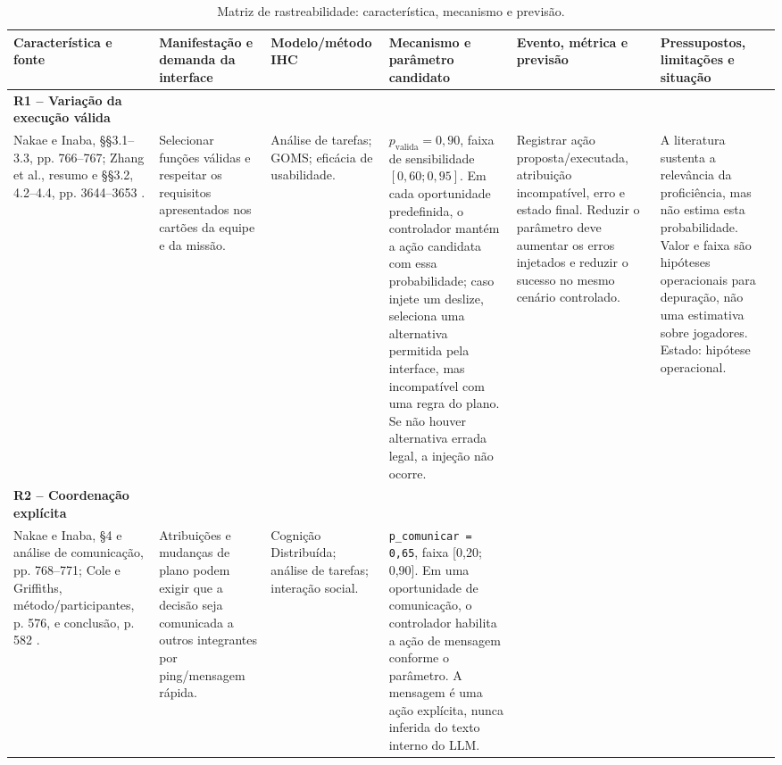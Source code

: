 \documentclass[conference]{IEEEtran}
\begin{document}
\begin{table}[!t]
\centering
\caption{Matriz de rastreabilidade: característica, mecanismo e previsão.}
\label{tab:matriz}
\scriptsize
\renewcommand{\arraystretch}{1.12}
\setlength{\tabcolsep}{3pt}
\begin{tabularx}{\textwidth}{@{}>{\RaggedRight\arraybackslash}p{1.9cm}>{\RaggedRight\arraybackslash}p{2.45cm}>{\RaggedRight\arraybackslash}p{1.9cm}>{\RaggedRight\arraybackslash}p{2.85cm}>{\RaggedRight\arraybackslash}p{2.9cm}Y@{}}
\toprule
\textbf{Característica e fonte} & \textbf{Manifestação e demanda da interface} & \textbf{Modelo/método IHC} & \textbf{Mecanismo e parâmetro candidato} & \textbf{Evento, métrica e previsão} & \textbf{Pressupostos, limitações e situação} \\
\midrule
\textbf{R1 -- Variação da execução válida}\\Nakae e Inaba, §§3.1--3.3, pp. 766--767; Zhang et al., resumo e §§3.2, 4.2--4.4, pp. 3644--3653 \cite{nakae2025,quickskill2022}. &
Selecionar funções válidas e respeitar os requisitos apresentados nos cartões da equipe e da missão. &
Análise de tarefas; GOMS; eficácia de usabilidade. &
$p_{\mathrm{valida}}=0{,}90$, faixa de sensibilidade $[0{,}60;0{,}95]$. Em cada oportunidade predefinida, o controlador mantém a ação candidata com essa probabilidade; caso injete um deslize, seleciona uma alternativa permitida pela interface, mas incompatível com uma regra do plano. Se não houver alternativa errada legal, a injeção não ocorre. &
Registrar ação proposta/executada, atribuição incompatível, erro e estado final. Reduzir o parâmetro deve aumentar os erros injetados e reduzir o sucesso no mesmo cenário controlado. &
A literatura sustenta a relevância da proficiência, mas não estima esta probabilidade. Valor e faixa são hipóteses operacionais para depuração, não uma estimativa sobre jogadores. Estado: hipótese operacional. \\
\midrule
\textbf{R2 -- Coordenação explícita}\\Nakae e Inaba, §4 e análise de comunicação, pp. 768--771; Cole e Griffiths, método/participantes, p. 576, e conclusão, p. 582 \cite{nakae2025,cole2007}. &
Atribuições e mudanças de plano podem exigir que a decisão seja comunicada a outros integrantes por ping/mensagem rápida. &
Cognição Distribuída; análise de tarefas; interação social. &
\texttt{p\_comunicar = 0,65}, faixa [0,20; 0,90]. Em uma oportunidade de comunicação, o controlador habilita a ação de mensagem conforme o parâmetro. A mensagem é uma ação explícita, nunca inferida do texto interno do LLM. &

\end{tabularx}
\end{table}
\end{document}
